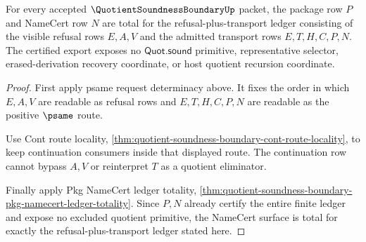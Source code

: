 \begin{theorem}
\label{thm:quotient-soundness-boundary-namecert-refusal-totality}
For every accepted $\QuotientSoundnessBoundaryUp$ packet, the package row $P$ and NameCert row $N$ are total for the refusal-plus-transport ledger consisting of the visible refusal rows $E,A,V$ and the admitted transport rows $E,T,H,C,P,N$. The certified export exposes no $\mathsf{Quot.sound}$ primitive, representative selector, erased-derivation recovery coordinate, or host quotient recursion coordinate.
\end{theorem}
\begin{proof}
First apply psame request determinacy above. It fixes the order in which $E,A,V$ are readable as refusal rows and $E,T,H,C,P,N$ are readable as the positive $\psame$ route.

Use Cont route locality, \autoref{thm:quotient-soundness-boundary-cont-route-locality}, to keep continuation consumers inside that displayed route. The continuation row cannot bypass $A,V$ or reinterpret $T$ as a quotient eliminator.

Finally apply Pkg NameCert ledger totality, \autoref{thm:quotient-soundness-boundary-pkg-namecert-ledger-totality}. Since $P,N$ already certify the entire finite ledger and expose no excluded quotient primitive, the NameCert surface is total for exactly the refusal-plus-transport ledger stated here.
\end{proof}

